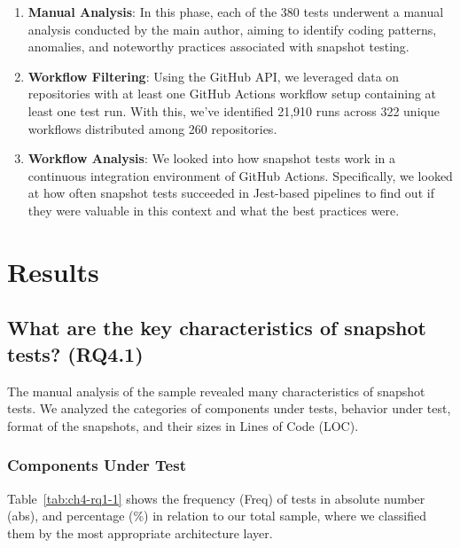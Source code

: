 \documentclass[
	msc, %
	english %
]{../ppgccufmg}
\begin{document}
\begin{enumerate}
        \item\textbf{Manual Analysis}: In this phase, each of the 380 tests underwent a manual analysis conducted by the main author, aiming to identify coding patterns, anomalies, and noteworthy practices associated with snapshot testing.

        \item\textbf{Workflow Filtering}: Using the GitHub API, we leveraged data on repositories with at least one GitHub Actions workflow setup containing at least one test run. With this, we've identified 21,910 runs across 322 unique workflows distributed among 260 repositories.

        \item\textbf{Workflow Analysis}: We looked into how snapshot tests work in a continuous integration environment of GitHub Actions. Specifically, we looked at how often snapshot tests succeeded in Jest-based pipelines to find out if they were valuable in this context and what the best practices were.

        \end{enumerate}
        
    \section{Results}\label{sec:ch4-results}

        \subsection{What are the key characteristics of snapshot tests? (RQ4.1)}

        The manual analysis of the sample revealed many characteristics of snapshot tests. We analyzed the categories of components under tests, behavior under test, format of the snapshots, and their sizes in Lines of Code (LOC).\\

        \subsubsection{Components Under Test}
        
        Table~\ref{tab:ch4-rq1-1} shows the frequency (Freq) of tests in absolute number (abs), and percentage (\%) in relation to our total sample, where we classified them by the most appropriate architecture layer.
          
\end{document}
